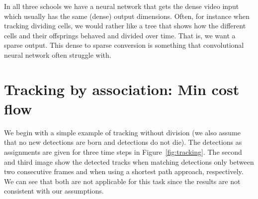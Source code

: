 In all three schools we have a neural network that gets the dense video input
which usually has the same (dense) output dimensions. Often, for instance when
tracking dividing cells, we would rather like a tree that shows how the
different cells and their offsprings behaved and divided over time. That is, we
want a sparse output. This dense to sparse conversion is something that
convolutional neural network often struggle with.

\section{Tracking by association: Min cost flow}
We begin with a simple example of tracking without division (we also assume that
no new detections are born and detections do not die). The detections as
assignments are given for three time steps in Figure~\ref{fig:tracking}. The
second and third image show the detected tracks when matching detections only
between two consecutive frames and when using a shortest path approach,
respectively. We can see that both are not applicable for this task since the
results are not consistent with our assumptions.

